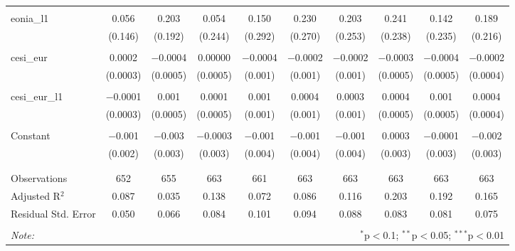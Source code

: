 \begin{table}[!htbp]
\begin{adjustbox}{width=1.35\textwidth}
\begin{tabular}{@{\extracolsep{5pt}}lccccccccc}
  & & & & & & & & & \\ 
 eonia\_l1 & 0.056 & 0.203 & 0.054 & 0.150 & 0.230 & 0.203 & 0.241 & 0.142 & 0.189 \\ 
  & (0.146) & (0.192) & (0.244) & (0.292) & (0.270) & (0.253) & (0.238) & (0.235) & (0.216) \\ 
  & & & & & & & & & \\ 
 cesi\_eur & 0.0002 & $-$0.0004 & 0.00000 & $-$0.0004 & $-$0.0002 & $-$0.0002 & $-$0.0003 & $-$0.0004 & $-$0.0002 \\ 
  & (0.0003) & (0.0005) & (0.0005) & (0.001) & (0.001) & (0.001) & (0.0005) & (0.0005) & (0.0004) \\ 
  & & & & & & & & & \\ 
 cesi\_eur\_l1 & $-$0.0001 & 0.001 & 0.0001 & 0.001 & 0.0004 & 0.0003 & 0.0004 & 0.001 & 0.0004 \\ 
  & (0.0003) & (0.0005) & (0.0005) & (0.001) & (0.001) & (0.001) & (0.0005) & (0.0005) & (0.0004) \\ 
  & & & & & & & & & \\ 
 Constant & $-$0.001 & $-$0.003 & $-$0.0003 & $-$0.001 & $-$0.001 & $-$0.001 & 0.0003 & $-$0.0001 & $-$0.002 \\ 
  & (0.002) & (0.003) & (0.003) & (0.004) & (0.004) & (0.004) & (0.003) & (0.003) & (0.003) \\ 
  & & & & & & & & & \\ 
\hline \\[-1.8ex] 
Observations & 652 & 655 & 663 & 661 & 663 & 663 & 663 & 663 & 663 \\ 
Adjusted R$^{2}$ & 0.087 & 0.035 & 0.138 & 0.072 & 0.086 & 0.116 & 0.203 & 0.192 & 0.165 \\ 
Residual Std. Error & 0.050 & 0.066 & 0.084 & 0.101 & 0.094 & 0.088 & 0.083 & 0.081 & 0.075 \\ 
\hline 
\hline \\[-1.8ex] 
\textit{Note:}  & \multicolumn{9}{r}{$^{*}$p$<$0.1; $^{**}$p$<$0.05; $^{***}$p$<$0.01} \\ 
\end{tabular} 
\end{adjustbox}
\end{table} 
